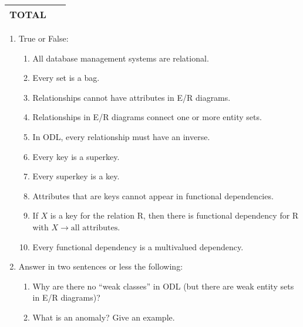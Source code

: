 {{{\begin{center}
\begin{tabular}{|c|l|}
\hspace{.05in} TOTAL \hspace{.05in} & \hspace{1in} \mbox{ }  \\ \hline \hline
\end{tabular}
\end{center}
}

\newpage



\begin{enumerate}

    \item True or False: 
    \begin{enumerate}
        \item \underline{\hspace{.25in}} All database management systems
		are relational.
        \item \underline{\hspace{.25in}} Every set is a bag.
        \item \underline{\hspace{.25in}} Relationships cannot have attributes
		in E/R diagrams. 
        \item \underline{\hspace{.25in}} Relationships in E/R diagrams 
		connect one or more entity sets.
        \item \underline{\hspace{.25in}} In ODL, every relationship must
		have an inverse.
        \item \underline{\hspace{.25in}} Every key is a superkey.
        \item \underline{\hspace{.25in}} Every superkey is a key.
        \item \underline{\hspace{.25in}} Attributes that are keys cannot 
		appear in functional dependencies.
        \item \underline{\hspace{.25in}} If $X$ is a key for the relation			R, then there is functional dependency for R with 
		$X \rightarrow \mbox{all attributes}$.
        \item \underline{\hspace{.25in}} Every functional dependency is
		a multivalued dependency.
    \end{enumerate}

\item Answer in two sentences or less the following:
\begin{enumerate}
    \item Why are there no ``weak classes'' in ODL (but there are weak
	entity sets in E/R diagrams)?
	\vspace{.75in}
    \item What is an anomaly?  Give an example.
	\vspace{.75in}
\end{enumerate}


\end{enumerate}}}
